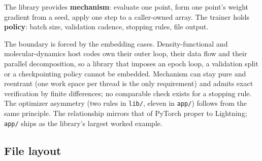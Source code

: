 \documentclass[10pt,a4paper]{article}
\newcommand{\code}[1]{\texttt{#1}}
\begin{document}
The library provides \textbf{mechanism}: evaluate one point, form one
point's weight gradient from a seed, apply one step to a caller-owned
array. The trainer holds \textbf{policy}: batch size, validation
cadence, stopping rules, file output.

The boundary is forced by the embedding cases. Density-functional and
molecular-dynamics host codes own their outer loop, their data flow
and their parallel decomposition, so a library that imposes an epoch
loop, a validation split or a checkpointing policy cannot be embedded.
Mechanism can stay pure and reentrant (one work space per thread is
the only requirement) and admits exact verification by finite
differences; no comparable check exists for a stopping rule. The
optimizer asymmetry (two rules in \code{lib/}, eleven in \code{app/})
follows from the same principle. The relationship mirrors that of
PyTorch proper to Lightning; \code{app/} ships as the library's
largest worked example.

\subsection{File layout}
\end{document}
